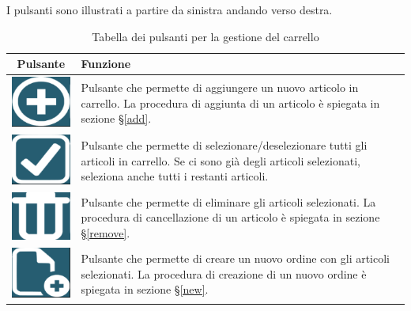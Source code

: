 I pulsanti sono illustrati a partire da sinistra andando verso destra.
\begin{table}[h]
	\centering
	\begin{tabular}{| c | >{\arraybackslash}m{14cm} |}
		\hline
		\textbf{Pulsante} & \textbf{Funzione} \\ \hline
		\includegraphics[]{./img/add.png} & Pulsante che permette di aggiungere un nuovo articolo in carrello. La procedura di aggiunta di 
		un articolo è spiegata in sezione §\ref{add}. \\ \hline
		\includegraphics[]{./img/select.png} & Pulsante che permette di selezionare/deselezionare tutti gli articoli in carrello. Se ci sono già degli articoli selezionati, seleziona anche tutti i restanti articoli. \\ \hline
		\includegraphics[]{./img/cestino.png} & Pulsante che permette di eliminare gli articoli selezionati. La procedura di cancellazione di
		un articolo è spiegata in sezione §\ref{remove}.  \\ \hline
		\includegraphics[]{./img/nuovoDocumento.png} & Pulsante che permette di creare un nuovo ordine con gli articoli selezionati. La procedura di creazione di un nuovo ordine è spiegata in sezione §\ref{new}. \\ \hline
 	\end{tabular}
 	\caption{Tabella dei pulsanti per la gestione del carrello}
\end{table}

